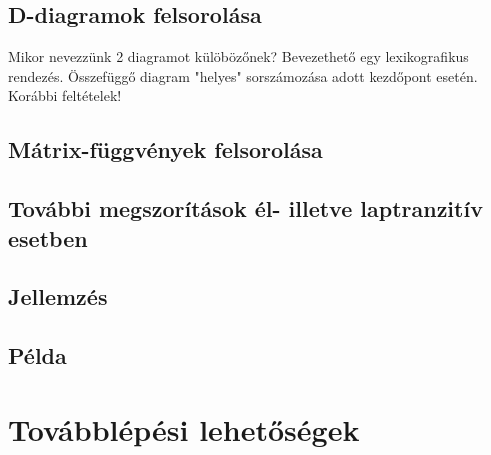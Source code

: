 \documentclass[12pt,magyar,a4paper]{article}
\begin{document}
\subsection{D-diagramok felsorolása}
Mikor nevezzünk 2 diagramot külöbözőnek? Bevezethető egy lexikografikus rendezés.
Összefüggő diagram "helyes" sorszámozása adott kezdőpont esetén.
Korábbi feltételek!
\subsection{Mátrix-függvények felsorolása}
\subsection{További megszorítások él- illetve laptranzitív esetben}
\subsection{Jellemzés}
\subsection{Példa}

\section{Továbblépési lehetőségek}

\nocite{DHM93,D87,Du88,H93,LM90,Ma67,M94,T82,VS93,F94,F03}


\end{document}
